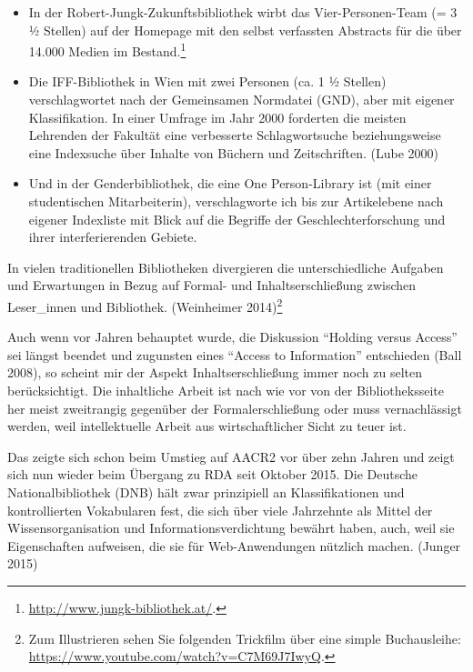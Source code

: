 \begin{itemize}
\item
  In der Robert-Jungk-Zukunftsbibliothek wirbt das Vier-Personen-Team (=
  3 ½ Stellen) auf der Homepage mit den selbst verfassten Abstracts für
  die über 14.000 Medien im Bestand.\footnote{\url{http://www.jungk-bibliothek.at/}.}
\item
  Die IFF-Bibliothek in Wien mit zwei Personen (ca. 1 ½ Stellen)
  verschlagwortet nach der Gemeinsamen Normdatei (GND), aber mit eigener
  Klassifikation. In einer Umfrage im Jahr 2000 forderten die meisten
  Lehrenden der Fakultät eine verbesserte Schlagwortsuche
  beziehungsweise eine Indexsuche über Inhalte von Büchern und
  Zeitschriften. (Lube 2000)
\item
  Und in der Genderbibliothek, die eine One Person-Library ist (mit
  einer studentischen Mitarbeiterin), verschlagworte ich bis zur
  Artikelebene nach eigener Indexliste mit Blick auf die Begriffe der
  Geschlechterforschung und ihrer interferierenden Gebiete.
\end{itemize}

In vielen traditionellen Bibliotheken divergieren die unterschiedliche
Aufgaben und Erwartungen in Bezug auf Formal- und Inhaltserschließung
zwischen Leser\_innen und Bibliothek. (Weinheimer 2014)\footnote{Zum
  Illustrieren sehen Sie folgenden Trickfilm über eine simple
  Buchausleihe: \url{https://www.youtube.com/watch?v=C7M69J7IwyQ}.}

Auch wenn vor Jahren behauptet wurde, die Diskussion \enquote{Holding
versus Access} sei längst beendet und zugunsten eines \enquote{Access to
Information} entschieden (Ball 2008), so scheint mir der Aspekt
Inhaltserschließung immer noch zu selten berücksichtigt. Die inhaltliche
Arbeit ist nach wie vor von der Bibliotheksseite her meist zweitrangig
gegenüber der Formalerschließung oder muss vernachlässigt werden, weil
intellektuelle Arbeit aus wirtschaftlicher Sicht zu teuer ist.

Das zeigte sich schon beim Umstieg auf AACR2 vor über zehn Jahren und
zeigt sich nun wieder beim Übergang zu RDA seit Oktober 2015. Die
Deutsche Nationalbibliothek (DNB) hält zwar prinzipiell an
Klassifikationen und kontrollierten Vokabularen fest, die sich über
viele Jahrzehnte als Mittel der Wissensorganisation und
Informationsverdichtung bewährt haben, auch, weil sie Eigenschaften
aufweisen, die sie für Web-Anwendungen nützlich machen. (Junger 2015)

